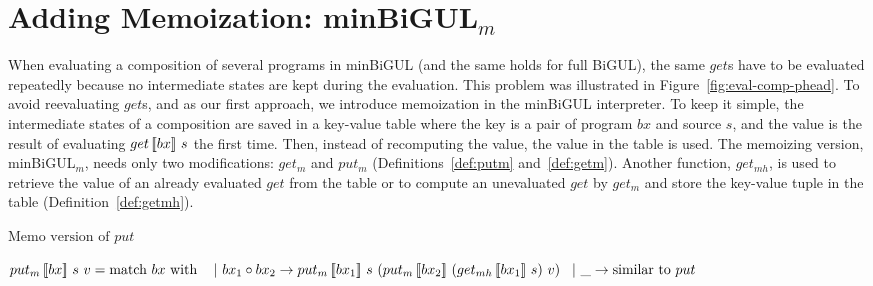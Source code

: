 \section{Adding Memoization: minBiGUL$_m$} \label{sect:minbigulm}

When evaluating a composition of several programs in minBiGUL (and the same holds for full BiGUL), the same $get$s have to be evaluated repeatedly because no intermediate states are kept during the evaluation. This problem was illustrated in Figure~\ref{fig:eval-comp-phead}. To avoid reevaluating $get$s, and as our first approach, we introduce memoization in the minBiGUL interpreter.
To keep it simple, the intermediate states of a composition are saved in a key-value table where the key is a pair of program $bx$ and source $s$, and the value is the result of evaluating $get \, [\![bx]\!] \ s$ the first time. Then, instead of recomputing the value, the value in the table is used. The memoizing version, minBiGUL$_m$, needs only two modifications: $get_m$ and $put_m$ (Definitions~\ref{def:putm} and~\ref{def:getm}). Another function, $get_{mh}$, is used to retrieve the value of an already evaluated $get$ from the table or to compute an unevaluated $get$ by $get_m$ and store the key-value tuple in the table (Definition~\ref{def:getmh}).

\begin{definition} \label{def:putm} $\text{Memo version of } put$

    \noindent $\putm{bx}{s}{v} = \text{match } bx \text{ with }\\
        \tab \vert \ bx_1 \circ bx_2 \to \putm{bx_1}{s}{(\putm{bx_2}{(\getmh{bx_1}{s})}{v})} \\
        \tab \vert \ \_ \to \text{similar to } put$
\end{definition}

